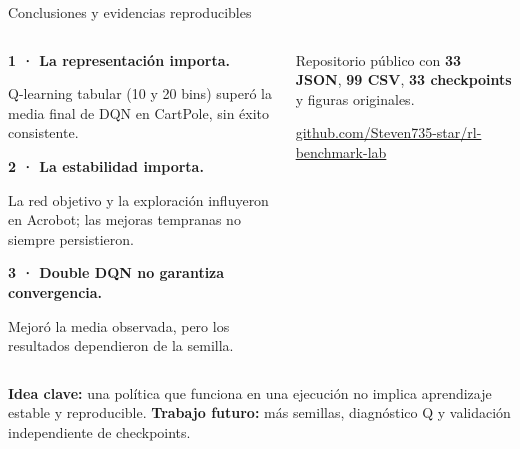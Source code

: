 \documentclass[aspectratio=169,10pt]{beamer}
\begin{document}
\begin{frame}{Conclusiones y evidencias reproducibles}
\begin{columns}[T,onlytextwidth]
\begin{info}
\small\textbf{1 · La representación importa.}\par
Q-learning tabular (10 y 20 bins) superó la media final de DQN en CartPole, sin éxito consistente.\par\vspace{.19cm}
\small\textbf{2 · La estabilidad importa.}\par
La red objetivo y la exploración influyeron en Acrobot; las mejoras tempranas no siempre persistieron.\par\vspace{.19cm}
\small\textbf{3 · Double DQN no garantiza convergencia.}\par
Mejoró la media observada, pero los resultados dependieron de la semilla.
\end{info}
\begin{takeaway}
\par\vspace{.12cm}
\small Repositorio público con \textbf{33 JSON}, \textbf{99 CSV}, \textbf{33 checkpoints} y figuras originales.\par\vspace{.23cm}
\scriptsize\href{https://github.com/Steven735-star/rl-benchmark-lab}{github.com/Steven735-star/\newline rl-benchmark-lab}
\end{takeaway}
\end{columns}
\vspace{.18cm}
\begin{info}
\small\textbf{Idea clave:} una política que funciona en una ejecución no implica aprendizaje estable y reproducible. \textbf{Trabajo futuro:} más semillas, diagnóstico Q y validación independiente de checkpoints.
\end{info}
\end{frame}
\end{document}
